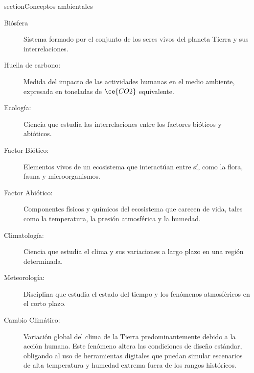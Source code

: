 section{Conceptos ambientales}
    \begin{description}
        \item[Biósfera] Sistema formado por el conjunto de los seres vivos del planeta Tierra y sus interrelaciones.
        \item[Huella de carbono:] Medida del impacto de las actividades humanas en el medio ambiente, expresada en toneladas de $\ce{CO2}$ equivalente. %
        \item[Ecología:] Ciencia que estudia las interrelaciones entre los factores bióticos y abióticos. %
        \item[Factor Biótico:] Elementos vivos de un ecosistema que interactúan entre sí, como la flora, fauna y microorganismos. %
        \item[Factor Abiótico:] Componentes físicos y químicos del ecosistema que carecen de vida, tales como la temperatura, la presión atmosférica y la humedad. %
        \item[Climatología:] Ciencia que estudia el clima y sus variaciones a largo plazo en una región determinada. %
        \item[Meteorología:] Disciplina que estudia el estado del tiempo y los fenómenos atmosféricos en el corto plazo. %
        \item[Cambio Climático:] Variación global del clima de la Tierra predominantemente debido a la acción humana. Este fenómeno altera las condiciones de diseño estándar, obligando al uso de herramientas digitales que puedan simular escenarios de alta temperatura y humedad extrema fuera de los rangos históricos.

\end{description}
